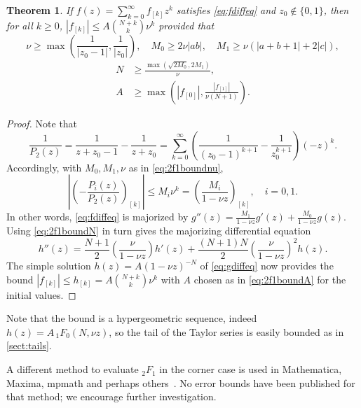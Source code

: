 \documentclass[11pt]{article}
\newtheorem{theorem}{Theorem}
\begin{document}
\begin{theorem}
If $f(z) = \sum_{k=0}^{\infty} f_{[k]} z^k$ satisfies \eqref{eq:fdiffeq} and $z_0 \not \in \{0,1\}$, then
for all $k \ge 0$,
$|f_{[k]}| \le A \binom{N+k}{k} \nu^k$
provided that
\begin{equation}
\label{eq:2f1boundnu} \nu \ge \max\left(\frac{1}{|z_0-1|}, \frac{1}{|z_0|}\right), \quad M_0 \ge 2 \nu |ab|, \quad M_1 \ge \nu (|a+b+1| + 2|c|),
\end{equation}
\begin{align}
\label{eq:2f1boundN} N &\ge \frac{\max(\sqrt{2 M_0}, 2 M_1)}{\nu}, \\
\label{eq:2f1boundA} A &\ge \max\left(|f_{[0]}|, \frac{|f_{[1]}|}{\nu (N+1)}\right).
\end{align}
\end{theorem}

\begin{proof}
Note that
\begin{equation*}
\frac{1}{P_2(z)} = \frac{1}{z+z_0-1} - \frac{1}{z+z_0} =
\sum_{k=0}^{\infty} \left(\frac{1}{(z_0-1)^{k+1}} - \frac{1}{z_0^{k+1}}\right) (-z)^k.
\end{equation*}
Accordingly, with $M_0, M_1, \nu$ as in \eqref{eq:2f1boundnu},
\begin{equation*}
\left|\left(-\frac{P_i(z)}{P_2(z)}\right)_{[k]}\right| \le M_i \nu^k = \left(\frac{M_i}{1-\nu z}\right)_{[k]},
\quad i = 0,1.
\end{equation*}
In other words, \eqref{eq:fdiffeq} is majorized by
$g''(z) = \frac{M_1}{1-\nu z} g'(z) + \frac{M_0}{1-\nu z} g(z).$
Using \eqref{eq:2f1boundN} in turn gives the majorizing differential equation
\begin{equation}
h''(z) = \frac{N+1}{2} \left( \frac{\nu}{1-\nu z} \right) h'(z)
+ \frac{(N+1)N}{2} \left( \frac{\nu}{1-\nu z} \right)^2 h(z).
\label{eq:gdiffeq}
\end{equation}
The simple solution $h(z) = A (1-\nu z)^{-N}$
of \eqref{eq:gdiffeq} now provides the bound
$|f_{[k]}| \le h_{[k]} = A \binom{N+k}{k} \nu^k$
with $A$ chosen as in \eqref{eq:2f1boundA} for the initial values.
\end{proof}

Note that the bound
is a hypergeometric sequence, indeed $h(z) = A \, {}_1F_0(N,\nu z)$,
so the tail of the Taylor series
is easily bounded as in \cref{sect:tails}.

A different method to evaluate ${}_2F_1$ in the corner case
is used in Mathematica, Maxima, mpmath and perhaps
others~\cite{maxgosp,vogtgosp}. No error bounds have been published
for that method; we encourage further investigation.
\end{document}
